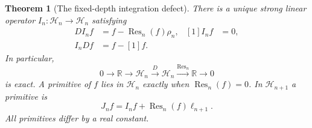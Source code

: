 \documentclass[11pt,a4paper]{article}
\numberwithin{equation}{section}
\newtheorem{theorem}{Theorem}[section]
\theoremstyle{definition}
\theoremstyle{remark}
\newcommand{\R}{\mathbb R}
\newcommand{\HH}{\mathcal H}
\newcommand{\Res}{\operatorname{Res}}
\begin{document}
\begin{theorem}[The fixed-depth integration defect]
\label{thm:residue}
There is a unique strong linear operator $I_n:\HH_n\to\HH_n$ satisfying
\begin{align}
 DI_nf&=f-\Res_n(f)\rho_n,&[1]I_nf&=0,\\
 I_nDf&=f-[1]f.&&
 \label{eq:integration-homotopy}
\end{align}
In particular,
\begin{equation}
 0\longrightarrow\R\longrightarrow\HH_n
 \xrightarrow{D}\HH_n\xrightarrow{\Res_n}\R
 \longrightarrow0
 \label{eq:exact-residue}
\end{equation}
is exact. A primitive of $f$ lies in $\HH_n$ exactly when $\Res_n(f)=0$. In $\HH_{n+1}$ a primitive is
\begin{equation}
 J_nf=I_nf+\Res_n(f)\ell_{n+1}.
 \label{eq:promoted-primitive}
\end{equation}
All primitives differ by a real constant.
\end{theorem}
\end{document}
